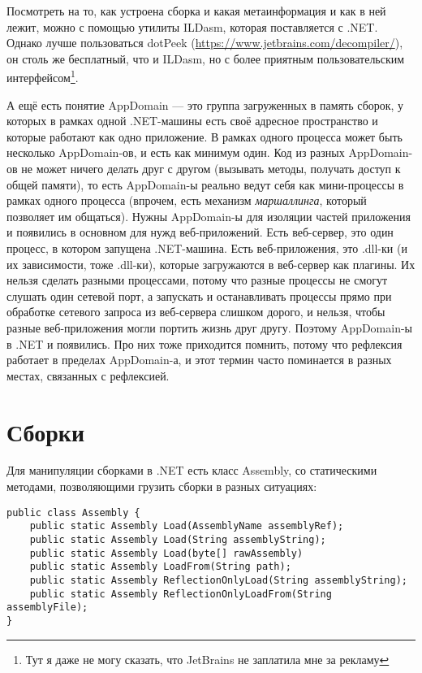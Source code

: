 \documentclass[a5paper]{article}
\begin{document}
Посмотреть на то, как устроена сборка и какая метаинформация и как в ней лежит, можно с помощью утилиты ILDasm, которая поставляется с .NET. Однако лучше пользоваться dotPeek (\url{https://www.jetbrains.com/decompiler/}), он столь же бесплатный, что и ILDasm, но с более приятным пользовательским интерфейсом\footnote{Тут я даже не могу сказать, что JetBrains не заплатила мне за рекламу}.

А ещё есть понятие AppDomain --- это группа загруженных в память сборок, у которых в рамках одной .NET-машины есть своё адресное пространство и которые работают как одно приложение. В рамках одного процесса может быть несколько AppDomain-ов, и есть как минимум один. Код из разных AppDomain-ов не может ничего делать друг с другом (вызывать методы, получать доступ к общей памяти), то есть AppDomain-ы реально ведут себя как мини-процессы в рамках одного процесса (впрочем, есть механизм \textit{маршаллинга}, который позволяет им общаться). Нужны AppDomain-ы для изоляции частей приложения и появились в основном для нужд веб-приложений. Есть веб-сервер, это один процесс, в котором запущена .NET-машина. Есть веб-приложения, это .dll-ки (и их зависимости, тоже .dll-ки), которые загружаются в веб-сервер как плагины. Их нельзя сделать разными процессами, потому что разные процессы не смогут слушать один сетевой порт, а запускать и останавливать процессы прямо при обработке сетевого запроса из веб-сервера слишком дорого, и нельзя, чтобы разные веб-приложения могли портить жизнь друг другу. Поэтому AppDomain-ы в .NET и появились. Про них тоже приходится помнить, потому что рефлексия работает в пределах AppDomain-а, и этот термин часто поминается в разных местах, связанных с рефлексией.

\section{Сборки}

Для манипуляции сборками в .NET есть класс Assembly, со статическими методами, позволяющими грузить сборки в разных ситуациях:

\begin{verbatim}
public class Assembly {
    public static Assembly Load(AssemblyName assemblyRef);
    public static Assembly Load(String assemblyString);
    public static Assembly Load(byte[] rawAssembly)
    public static Assembly LoadFrom(String path);
    public static Assembly ReflectionOnlyLoad(String assemblyString);
    public static Assembly ReflectionOnlyLoadFrom(String assemblyFile);
}
\end{verbatim}
\end{document}
